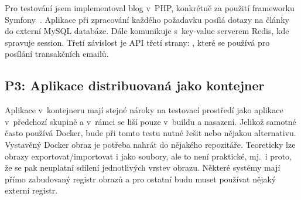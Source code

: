         Pro testování jsem implementoval blog v~PHP, konkrétně za použití frameworku Symfony~\cite{symfony}. Aplikace při zpracování každého požadavku posílá dotazy na články do externí MySQL databáze. Dále komunikuje s~key-value serverem Redis, kde spravuje session. Třetí závislost je API třetí strany: , které se používá pro posílání transakčních emailů.

    \subsection{P3: Aplikace distribuovaná jako kontejner}
        Aplikace v~kontejneru mají stejné nároky na testovací prostředí jako aplikace v~předchozí skupině a v~rámci \CICD se liší pouze v~buildu a nasazení. Jelikož samotné \CI často používá Docker, bude při tomto testu nutné řešit  nebo nějakou alternativu. Vystavěný Docker obraz je potřeba nahrát do nějakého repozitáře. Teoreticky lze obrazy exportovat/importovat i jako soubory, ale to není praktické, mj.~i proto, že se pak neuplatní sdílení jednotlivých vrstev obrazu. Některé systémy mají přímo zabudovaný registr obrazů a pro ostatní budu muset používat nějaký externí registr.
